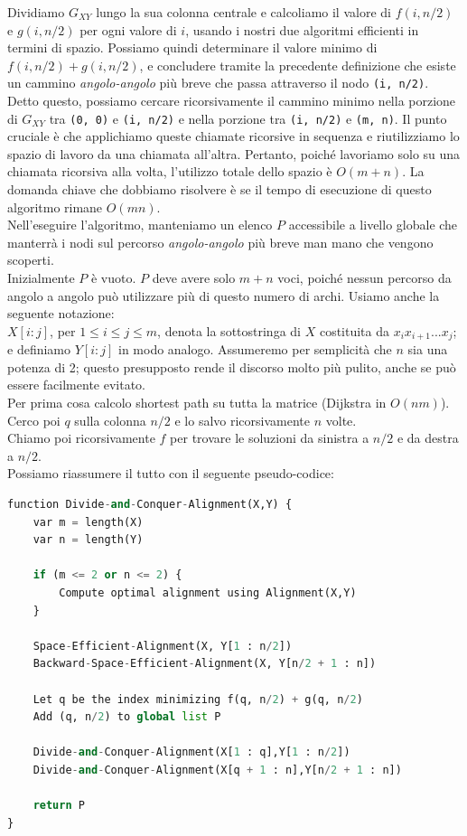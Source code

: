 Dividiamo $G_{XY}$ lungo la sua colonna centrale e calcoliamo il
valore di $f(i, n/2)$ e $g(i, n/2)$ per ogni valore di $i$, usando
i nostri due algoritmi efficienti in termini di spazio. Possiamo quindi
determinare il valore minimo di $f(i, n/2) + g(i, n/2)$, e concludere
tramite la precedente definizione che esiste un cammino
\emph{angolo-angolo} più breve che passa attraverso il nodo
\texttt{(i,\ n/2)}. Detto questo, possiamo cercare ricorsivamente il
cammino minimo nella porzione di $G_{XY}$ tra \texttt{(0,\ 0)} e
\texttt{(i,\ n/2)} e nella porzione tra \texttt{(i,\ n/2)} e
\texttt{(m,\ n)}. Il punto cruciale è che applichiamo queste chiamate
ricorsive in sequenza e riutilizziamo lo spazio di lavoro da una
chiamata all'altra. Pertanto, poiché lavoriamo solo su una chiamata
ricorsiva alla volta, l'utilizzo totale dello spazio è $O(m + n)$. La
domanda chiave che dobbiamo risolvere è se il tempo di esecuzione di
questo algoritmo rimane $O(mn)$.\\ Nell'eseguire l'algoritmo, manteniamo
un elenco $P$ accessibile a livello globale che manterrà i nodi sul
percorso \emph{angolo-angolo} più breve man mano che vengono scoperti.\\
Inizialmente $P$ è vuoto. $P$ deve avere solo $m + n$ voci, poiché
nessun percorso da angolo a angolo può utilizzare più di questo numero
di archi. Usiamo anche la seguente notazione:\\ $X[i : j]$, per
$1 \le i \le j \le m$, denota la sottostringa di $X$ costituita da
$x_i x_{i+1} ... x_j$;\\ e definiamo $Y[i : j]$ in modo analogo.
Assumeremo per semplicità che $n$ sia una potenza di 2; questo
presupposto rende il discorso molto più pulito, anche se può essere
facilmente evitato.\\

Per prima cosa calcolo shortest path su tutta la matrice (Dijkstra in
$O(nm)$). Cerco poi $q$ sulla colonna $n/2$ e lo salvo
ricorsivamente $n$ volte.\\ Chiamo poi ricorsivamente $f$ per trovare
le soluzioni da sinistra a $n/2$ e da destra a $n/2$.\\

Possiamo riassumere il tutto con il seguente pseudo-codice:

\begin{lstlisting}[language=Python, mathescape=true]
function Divide-and-Conquer-Alignment(X,Y) {
    var m = length(X)
    var n = length(Y)

    if (m <= 2 or n <= 2) {
        Compute optimal alignment using Alignment(X,Y)
    }
    
    Space-Efficient-Alignment(X, Y[1 : n/2])
    Backward-Space-Efficient-Alignment(X, Y[n/2 + 1 : n])

    Let q be the index minimizing f(q, n/2) + g(q, n/2)
    Add (q, n/2) to global list P

    Divide-and-Conquer-Alignment(X[1 : q],Y[1 : n/2])
    Divide-and-Conquer-Alignment(X[q + 1 : n],Y[n/2 + 1 : n])
    
    return P
}
\end{lstlisting}

